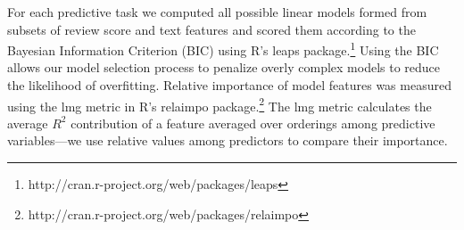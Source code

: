 \documentclass[letterpaper]{article}
\begin{document}
For each predictive task we computed all possible linear models formed from subsets of review score and text features and scored them according to the Bayesian Information Criterion (BIC) using R's leaps package.\footnote{http://cran.r-project.org/web/packages/leaps} Using the BIC allows our model selection process to penalize overly complex models to reduce the likelihood of overfitting. Relative importance of model features was measured using the lmg metric in R's relaimpo package.\footnote{http://cran.r-project.org/web/packages/relaimpo} The lmg metric calculates the average $R^2$ contribution of a feature averaged over orderings among predictive variables---we use relative values among predictors to compare their importance.


\end{document}

